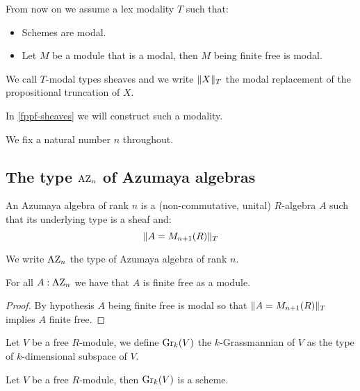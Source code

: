 From now on we assume a lex modality $T$ such that:
\begin{itemize}
\item Schemes are modal.
\item Let $M$ be a module that is a modal, then $M$ being finite free is modal.
\end{itemize}
We call $T$-modal types sheaves and we write $\lVert X \rVert_T$ the modal replacement of the propositional truncation of $X$.

In \cref{fppf-sheaves} we will construct such a modality.

We fix a natural number $n$ throughout.


\subsection{The type $\mathrm{AZ}_n$ of Azumaya algebras}

\begin{definition}
An Azumaya algebra of rank $n$ is a (non-commutative, unital) $R$-algebra $A$ such that its underlying type is a sheaf and:
\[\lVert A=M_{n+1}(R) \rVert_T\]
\end{definition}

We write $\mathrm{AZ}_n$ the type of Azumaya algebra of rank $n$.

\begin{lemma}\label{azumayas-are-finite-free}
For all $A:\mathrm{AZ}_n$ we have that $A$ is finite free as a module.
\end{lemma}

\begin{proof}
By hypothesis $A$ being finite free is modal so that $\lVert A=M_{n+1}(R) \rVert_T$ implies $A$ finite free.
\end{proof}

\begin{definition}
Let $V$ be a free $R$-module, we define $\mathrm{Gr}_k(V)$ the $k$-Grassmannian of $V$ as the type of $k$-dimensional subspace of $V$.
\end{definition}

\begin{lemma}\label{grassmanians-are-schemes}
Let $V$ be a free $R$-module, then $\mathrm{Gr}_k(V)$ is a scheme.
\end{lemma}

